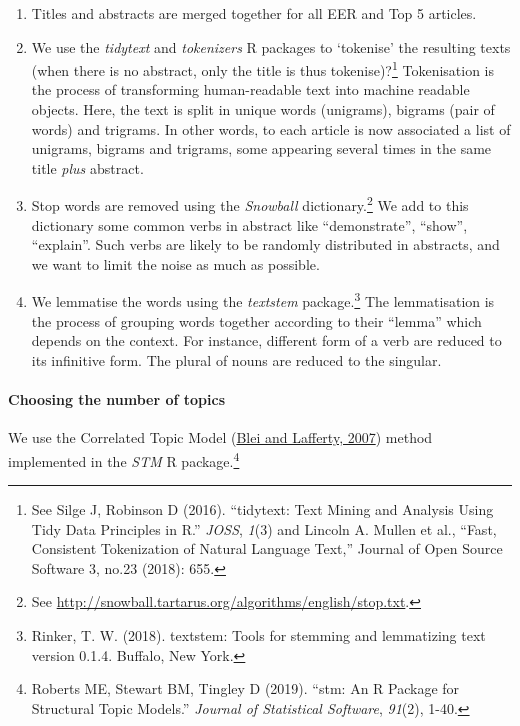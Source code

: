 \documentclass[
  12pt,
  onecolumn]{article}
\providecommand{\tightlist}{%
  \setlength{\itemsep}{0pt}\setlength{\parskip}{0pt}}
\begin{document}
\begin{enumerate}
\def\labelenumi{\arabic{enumi}.}
\tightlist
\item
  Titles and abstracts are merged together for all EER and Top 5
  articles.
\item
  We use the \emph{tidytext} and \emph{tokenizers} R packages to
  `tokenise' the resulting texts (when there is no abstract, only the
  title is thus tokenise)?\footnote{See Silge J, Robinson D (2016).
    ``tidytext: Text Mining and Analysis Using Tidy Data Principles in
    R.'' \emph{JOSS}, \emph{1}(3) and Lincoln A. Mullen et al., ``Fast,
    Consistent Tokenization of Natural Language Text,'' Journal of Open
    Source Software 3, no.23 (2018): 655.} Tokenisation is the process
  of transforming human-readable text into machine readable objects.
  Here, the text is split in unique words (unigrams), bigrams (pair of
  words) and trigrams. In other words, to each article is now associated
  a list of unigrams, bigrams and trigrams, some appearing several times
  in the same title \emph{plus} abstract.
\item
  Stop words are removed using the \emph{Snowball}
  dictionary.\footnote{See
    \url{http://snowball.tartarus.org/algorithms/english/stop.txt}.} We
  add to this dictionary some common verbs in abstract like
  ``demonstrate'', ``show'', ``explain''. Such verbs are likely to be
  randomly distributed in abstracts, and we want to limit the noise as
  much as possible.
\item
  We lemmatise the words using the \emph{textstem} package.\footnote{Rinker,
    T. W. (2018). textstem: Tools for stemming and lemmatizing text
    version 0.1.4. Buffalo, New York.} The lemmatisation is the process
  of grouping words together according to their ``lemma'' which depends
  on the context. For instance, different form of a verb are reduced to
  its infinitive form. The plural of nouns are reduced to the singular.
\end{enumerate}

\hypertarget{choosing-the-number-of-topics}{%
\paragraph*{Choosing the number of
topics}\label{choosing-the-number-of-topics}}

We use the Correlated Topic Model (\protect\hyperlink{ref-blei2007}{Blei
and Lafferty, 2007}) method implemented in the \emph{STM} R
package.\footnote{Roberts ME, Stewart BM, Tingley D (2019). ``stm: An R
  Package for Structural Topic Models.'' \emph{Journal of Statistical
  Software}, \emph{91}(2), 1-40.}
\end{document}
